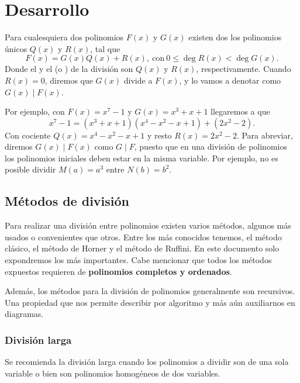 \section{Desarrollo}

\begin{definition}
    Para cualesquiera dos polinomios $F(x)$ y $G(x)$ existen dos los polinomios únicos $Q(x)$ y $R(x)$, tal que
    \[
        F(x) = G(x)Q(x) + R(x),\ \text{con}\ 0 \leq \deg{R(x)} < \deg{G(x)}.
    \]
    Donde el  y el  (o ) de la división son $Q(x)$ y $R(x)$, respectivamente.
    Cuando $R(x) = 0$, diremos que $G(x)$ divide a $F(x)$, y lo vamos a denotar como $G(x) \mid F(x)$.
\end{definition}
Por ejemplo, con $F(x) = x^7 - 1$ y $G(x) = x^3 + x + 1$ llegaremos a que
\[
    x^7 - 1 = (x^3 + x + 1)(x^4 - x^2 - x + 1) + (2 x^2 - 2).
\]
Con cociente $Q(x) = x^4 - x^2 - x + 1$ y resto $R(x) = 2 x^2 - 2$.
Para abreviar, diremos $G(x) \mid F(x)$ como $G \mid F$, puesto que en una división de polinomios los polinomios iniciales deben estar en la misma variable.
Por ejemplo, no es posible dividir $M(a) = a^3$ entre $N(b) = b^2$.


\subsection{Métodos de división}

Para realizar una división entre polinomios existen varios métodos, algunos más usados o convenientes que otros.
Entre los más conocidos tenemos, el método clásico, el método de Horner y el método de Ruffini.
En este documento solo expondremos los más importantes.
Cabe mencionar que todos los métodos expuestos requieren de \textbf{polinomios completos y ordenados}.

Además, los métodos para la división de polinomios generalmente son recursivos.
Una propiedad que nos permite describir por algoritmo y más aún auxiliarnos en diagramas.

\subsubsection{División larga}

Se recomienda la división larga cuando los polinomios a dividir son de una sola variable o bien son polinomios homogéneos de dos variables.

\vspace{1cm}

